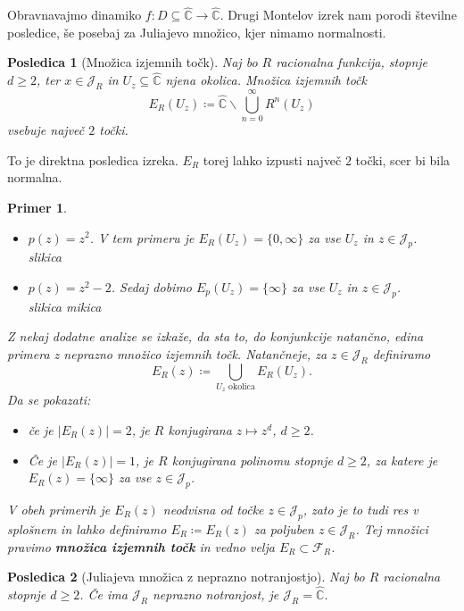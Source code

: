 \documentclass{article}
\newtheorem{posledica}{Posledica}
\newtheorem{primer}{Primer}
\newcommand{\C}{\mathbb{C}}
\newcommand{\F}{\mathcal{F}}
\begin{document}
Obravnavajmo dinamiko $f:D\subseteq \hat{\C} \rightarrow \hat{\C}$. 
Drugi Montelov izrek nam porodi številne posledice,  še posebaj 
za Juliajevo množico, kjer nimamo normalnosti.

\begin{posledica}[Množica izjemnih točk]
Naj bo $R$ racionalna funkcija, stopnje $d\geq 2$, ter $x\in \mathcal{J}_R$
in $U_z \subseteq \hat{\C}$ njena okolica. Množica izjemnih točk
$$
E_R(U_z) \coloneqq \hat{\C} \backslash \bigcup_{n=0}^\infty R^n(U_z)
$$
vsebuje največ $2$ točki.
\end{posledica}

To je direktna posledica izreka. $E_R$ torej lahko izpusti največ $2$ točki, scer bi bila normalna.

\begin{primer}
    \hfill
\begin{itemize}
    \item $p(z) = z^2$. V tem primeru je $E_R(U_z) = \{0, \infty\}$ za vse 
    $U_z$ in $z\in \mathcal{J}_p$.\\
    slikica
    \item $p(z) = z^2 - 2$. Sedaj dobimo $E_p(U_z) = \{\infty \}$ za vse 
    $U_z$ in $z\in \mathcal{J}_p$.\\
    slikica mikica
\end{itemize}
Z nekaj dodatne analize se izkaže, da sta to, do konjunkcije natančno, 
edina primera z neprazno množico izjemnih točk. Natančneje, za $z\in \mathcal{J}_R$ 
definiramo 
$$
E_R(z) \coloneqq \bigcup_{U_z \text{ okolica}} E_R(U_z). 
$$
Da se pokazati:
\begin{itemize}
    \item če je $|E_R(z)| = 2$, je $R$ konjugirana $z \mapsto z^d$, $d \geq 2$.
    \item Če je $|E_R(z)| = 1$, je $R$ konjugirana polinomu stopnje $d \geq 2$, 
    za katere je $E_R(z) = \{\infty\}$ za vse $z\in \mathcal{J}_p$. 
\end{itemize}
V obeh primerih je $E_R(z)$ neodvisna od točke $z\in \mathcal{J}_p$,
zato je to tudi res v splošnem in lahko definiramo $E_R \coloneqq E_R(z)$
za poljuben $z\in \mathcal{J}_R$. Tej množici pravimo \textbf{množica izjemnih 
točk} in vedno velja $E_R \subset \F_R$.
\end{primer}

\begin{posledica}[Juliajeva množica z neprazno notranjostjo]
Naj bo $R$ racionalna stopnje $d \geq 2$. Če ima $\mathcal{J}_R$
 neprazno notranjost, je $\mathcal{J}_R = \hat{\C}$.
\end{posledica}
\end{document}
